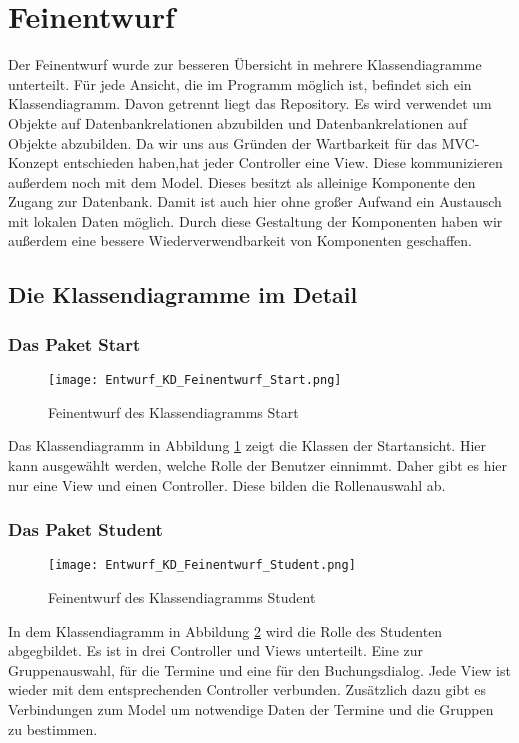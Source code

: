 \documentclass[a4paper,10pt]{article}
\begin{document}
  \newpage
\section{Feinentwurf}
Der Feinentwurf wurde zur besseren Übersicht in mehrere Klassendiagramme unterteilt. Für jede Ansicht, die im Programm möglich ist, befindet sich ein Klassendiagramm.
Davon getrennt liegt das Repository. Es wird verwendet um Objekte auf Datenbankrelationen abzubilden und Datenbankrelationen auf Objekte abzubilden. Da wir uns aus Gründen der Wartbarkeit für das MVC-Konzept entschieden haben,hat jeder Controller eine View.
Diese kommunizieren außerdem noch mit dem Model. Dieses besitzt als alleinige Komponente den Zugang zur Datenbank. Damit ist auch hier ohne großer Aufwand ein Austausch mit lokalen Daten möglich.
Durch diese Gestaltung der Komponenten haben wir außerdem eine bessere Wiederverwendbarkeit von Komponenten geschaffen. 

 \subsection{Die Klassendiagramme im Detail}
 \subsubsection{Das Paket Start}
 
 \begin{figure}
  \texttt{[image: Entwurf\_KD\_Feinentwurf\_Start.png]}
  \label{fig:Klassendiagramm_Start}
  \caption{Feinentwurf des Klassendiagramms Start}
 \end{figure} 
 
 Das Klassendiagramm in Abbildung \ref{fig:Klassendiagramm_Start} zeigt die Klassen der Startansicht. Hier kann ausgewählt werden, welche Rolle der Benutzer einnimmt. 
 Daher gibt es hier nur eine View und einen Controller. Diese bilden die Rollenauswahl ab.
 \subsubsection{Das Paket Student}
 
 \begin{figure}
\texttt{[image: Entwurf\_KD\_Feinentwurf\_Student.png]}
\label{fig:Klassendiagramm_Student}
\caption{Feinentwurf des Klassendiagramms Student}
 \end{figure} 

 In dem Klassendiagramm in Abbildung \ref{fig:Klassendiagramm_Student} wird die Rolle des Studenten abgegbildet. Es ist in drei Controller und Views unterteilt. Eine zur Gruppenauswahl, für die Termine und eine für den Buchungsdialog.
 Jede View ist wieder mit dem entsprechenden Controller verbunden. Zusätzlich dazu gibt es Verbindungen zum Model um notwendige Daten der Termine und die Gruppen zu bestimmen.
\end{document}
